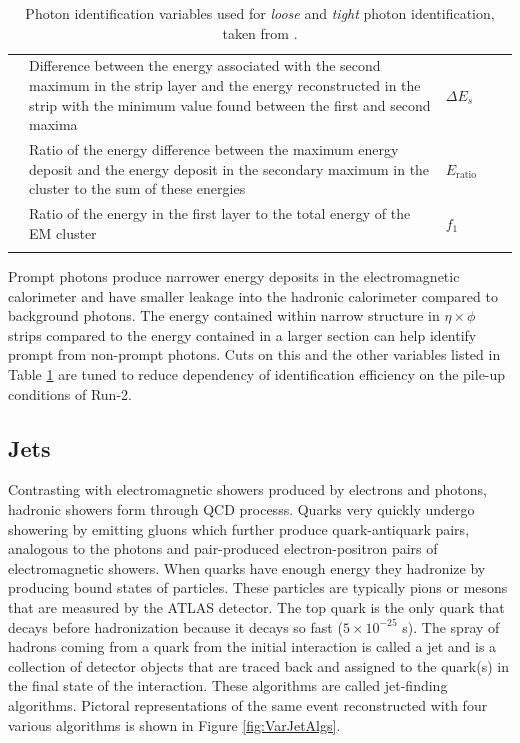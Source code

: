 \begin{center}
\begin{table}
{{\begin{tabularx}{1. \textwidth}{ l X lll }
		 & Difference between the energy associated with the second maximum in the strip layer and the energy reconstructed in the strip with the minimum value found between the first and second maxima & $\Delta E_s$ &  &   \checkmark \\
		 & Ratio of the energy difference between the maximum energy deposit and the energy deposit in the secondary maximum in the cluster to the sum of these energies & $E_\text{ratio}$ &  &  \checkmark \\
		 & Ratio of the energy in the first layer to the total energy of the EM cluster & $f_1$ &  &  \checkmark \\
\hhline{=====}
\end{tabularx}
\normalsize
}}
\caption[Photon identification variables used for \textit{loose} and \textit{tight} photon identification.]{Photon identification variables used for \textit{loose} and \textit{tight} photon identification, taken from \cite{PhotonID}.}
\label{tab:PhotonVars}
\end{table}
\end{center}

Prompt photons produce narrower energy deposits in the electromagnetic calorimeter and have smaller leakage into the hadronic calorimeter compared to background photons.  The energy contained within narrow structure in $\eta \times \phi$ strips compared to the energy contained in a larger section can help identify prompt from non-prompt photons\cite{PhotonID}.  Cuts on this and the other variables listed in Table \ref{tab:PhotonVars} are tuned to reduce dependency of identification efficiency on the pile-up conditions of Run-2.


\subsection{Jets}

Contrasting with electromagnetic showers produced by electrons and photons, hadronic showers form through QCD processs.  Quarks very quickly undergo showering by emitting gluons which further produce quark-antiquark pairs, analogous to the photons and pair-produced electron-positron pairs of electromagnetic showers.   When quarks have enough energy they hadronize by producing bound states of particles.  These particles are typically pions or mesons that are measured by the ATLAS detector.  The top quark is the only quark that decays before hadronization because it decays so fast ($5\times10^{-25}$ s).  The spray of hadrons coming from a quark from the initial interaction is called a jet and is a collection of detector objects that are traced back and assigned to the quark(s) in the final state of the interaction.  These algorithms are called jet-finding algorithms.  Pictoral representations of the same event reconstructed with four various algorithms is shown in Figure \ref{fig:VarJetAlgs}.

